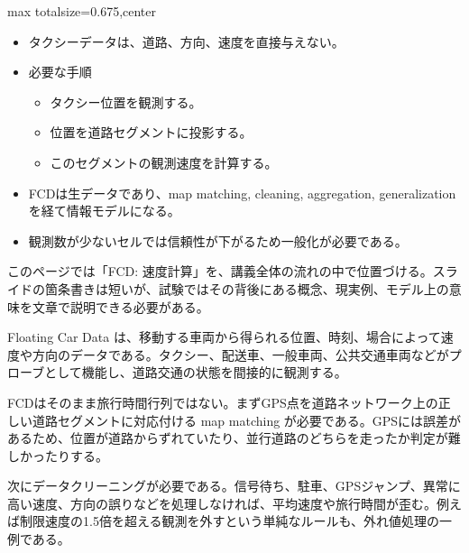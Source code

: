 \clearpage
{}
\begin{adjustbox}{max totalsize={\textwidth}{0.675\textheight},center}
\begin{minipage}{\textwidth}\scriptsize
\begin{minipage}[t]{0.485\textwidth}
\begin{itemize}
\item タクシーデータは、道路、方向、速度を直接与えない。
\item 必要な手順
\begin{itemize}
\item タクシー位置を観測する。
\item 位置を道路セグメントに投影する。
\item このセグメントの観測速度を計算する。
\end{itemize}
\end{itemize}
\begin{itemize}
\item FCDは生データであり、map matching, cleaning, aggregation, generalization を経て情報モデルになる。
\item 観測数が少ないセルでは信頼性が下がるため一般化が必要である。
\end{itemize}
\end{minipage}\hfill
\begin{minipage}[t]{0.485\textwidth}
このページでは「FCD: 速度計算」を、講義全体の流れの中で位置づける。スライドの箇条書きは短いが、試験ではその背後にある概念、現実例、モデル上の意味を文章で説明できる必要がある。\par
Floating Car Data は、移動する車両から得られる位置、時刻、場合によって速度や方向のデータである。タクシー、配送車、一般車両、公共交通車両などがプローブとして機能し、道路交通の状態を間接的に観測する。\par
FCDはそのまま旅行時間行列ではない。まずGPS点を道路ネットワーク上の正しい道路セグメントに対応付ける map matching が必要である。GPSには誤差があるため、位置が道路からずれていたり、並行道路のどちらを走ったか判定が難しかったりする。\par
次にデータクリーニングが必要である。信号待ち、駐車、GPSジャンプ、異常に高い速度、方向の誤りなどを処理しなければ、平均速度や旅行時間が歪む。例えば制限速度の1.5倍を超える観測を外すという単純なルールも、外れ値処理の一例である。\par

\end{minipage}
\end{minipage}
\end{adjustbox}
